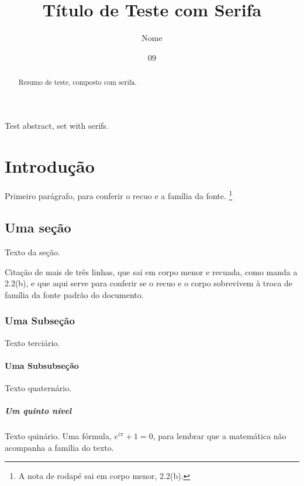 \documentclass[dsc,comserifa,pdfa]{ufrj}
\title{Título de Teste com Serifa}
\author{Nome}{de Teste}
\date{09}{2026}
\begin{document}
  \maketitle
  \frontmatter
  \begin{abstract}
    Resumo de teste, composto com serifa.
  \end{abstract}
  \begin{foreignabstract}
    Test abstract, set with serifs.
  \end{foreignabstract}
  \tableofcontents
  \mainmatter

  \chapter{Introdução}
    Primeiro parágrafo, para conferir o recuo e a família da fonte.%
    \footnote{A nota de rodapé sai em corpo menor, 2.2(b).}
  \section{Uma seção}
    Texto da seção.
    \begin{longquote}
      Citação de mais de três linhas, que sai em corpo menor e recuada,
      como manda a 2.2(b), e que aqui serve para conferir se o recuo e o
      corpo sobrevivem à troca de família da fonte padrão do documento.
    \end{longquote}
  \subsection{Uma Subseção}
    Texto terciário.
  \subsubsection{Uma Subsubseção}
    Texto quaternário.
  \paragraph{Um quinto nível}
    Texto quinário. Uma fórmula, $e^{i\pi} + 1 = 0$, para lembrar que a
    matemática não acompanha a família do texto.
\end{document}
